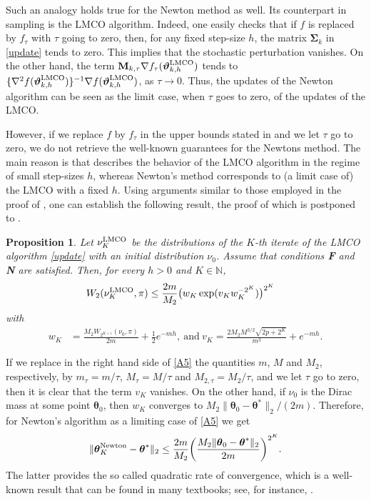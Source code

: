 \documentclass[aoap,preprint,reqno,a4paper]{imsart} %
\newcommand{\NN}{\mathbb{N}}
\newcommand{\btheta}{\boldsymbol{\theta}}
\newcommand{\bvartheta}{\boldsymbol{\vartheta}}
\newcommand{\bfM}{\mathbf M}
\newcommand{\bfSigma}{\boldsymbol\Sigma}
\newtheorem{proposition}{Proposition}
\begin{document}
Such an analogy holds true for the Newton method as well. Its counterpart in sampling is the
LMCO algorithm. Indeed, one easily checks that if $f$ is replaced by $f_\tau$ with $\tau$ going to
zero, then, for any fixed step-size $h$, the matrix $\bfSigma_k$ in \eqref{update} tends to zero.
This implies that the stochastic perturbation vanishes. On the other hand, the term
$\bfM_{k,\tau}\nabla f_\tau(\bvartheta_{k,h}^{\rm LMCO})$ tends to $\{\nabla^2 f
(\bvartheta_{k,h}^{\rm LMCO})\}^{-1}\nabla f(\bvartheta_{k,h}^{\rm LMCO})$, as $\tau\to 0$.
Thus, the updates of the Newton algorithm can be seen as the limit case, when $\tau$ goes to
zero, of the updates of the LMCO.

However, if we replace $f$ by $f_\tau$ in the upper bounds stated in  and we
let $\tau$ go to zero, we do not retrieve the well-known guarantees for the Newtons method.
The main reason is that  describes the behavior of the LMCO algorithm in the
regime of small step-sizes $h$, whereas Newton's method corresponds to (a limit case of) the
LMCO with a fixed $h$. Using arguments similar to those employed in the proof of ,
one can establish the following result, the proof of which is postponed to .

\begin{proposition} \label{propB}
Let $\nu_K^{\rm LMCO}$ be the distributions of the $K$-th iterate of the LMCO
algorithm \eqref{update} with an initial distribution $\nu_0$.  Assume that conditions
{\bf F}  and {\bf N} are  satisfied. Then, for every  $h>0$ and $K\in\NN$,
\begin{align}\label{A5}
W_2(\nu_K^{\rm LMCO}, \pi)	&\le \frac{2m}{M_2} \big(w_K\exp(v_Kw_K^{-2^K})\big)^{2^K}
\end{align}
with
\begin{align}
w_K &= \frac{M_2W_{2^{K+1}}(\nu_0,\pi)}{2m}+\frac12e^{-mh},\ \text{and}\
v_K = \frac{2M_2 M^{3/2}\sqrt{2p+2^{K}}}{m^3} +e^{-mh}.
\end{align}		
\end{proposition}

If we replace in the right hand side of \eqref{A5} the quantities $m$, $M$ and $M_2$, respectively,
by $m_\tau = m/\tau$, $M_\tau = M/\tau$ and $M_{2,\tau} = M_2/\tau$, and we let $\tau$ go to zero,
then it is clear that the term $v_K$ vanishes. On the other hand, if $\nu_0$ is the Dirac mass at some
point $\btheta_0$, then $w_K$ converges to $M_2\|\btheta_0-\btheta^*\|_2/(2m)$. Therefore, for Newton's
algorithm as a limiting case of \eqref{A5} we get
\begin{align}
\|\btheta_K^{\rm Newton}-\btheta^*\|_2 \le \frac{2m}{M_2} \bigg(\frac{M_2\|\btheta_0-\btheta^*\|_2}{2m}\bigg)^{2^K}.
\end{align}
The latter provides the so called quadratic rate of convergence, which is a well-known result that can be found in
many textbooks; see, for instance, \cite[Theorem 9.1]{ChongZak}.
\end{document}
